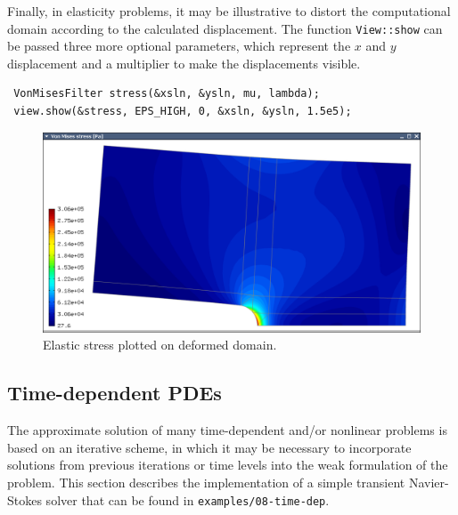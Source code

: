 Finally, in elasticity problems, it may be illustrative to distort the computational
domain according to the calculated displacement. The function \verb"View::show" can be
passed three more optional parameters, which represent the $x$ and $y$ displacement
and a multiplier to make the displacements visible.
\begin{lstlisting}
 VonMisesFilter stress(&xsln, &ysln, mu, lambda);
 view.show(&stress, EPS_HIGH, 0, &xsln, &ysln, 1.5e5);
\end{lstlisting}


\begin{figure}[ht]
  \medskip \centering
  \includegraphics[width=\textwidth]{img/mises.png}
  \caption{Elastic stress plotted on deformed domain.}
  \label{elastsln}
\end{figure}



\subsection{Time-dependent PDEs}

The approximate solution of many time-dependent and/or nonlinear problems is based on
an iterative scheme, in which it may be necessary to incorporate solutions from
previous iterations or time levels into the weak formulation of the problem.
This section describes the implementation of a simple transient Navier-Stokes solver
that can be found in {\tt examples/08-time-dep}.

